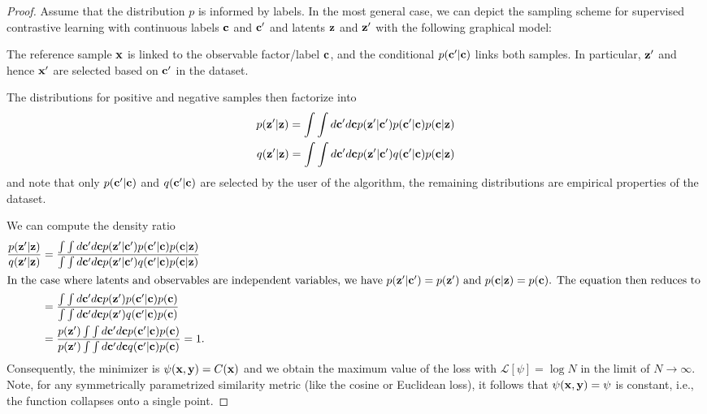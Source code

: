    \begin{proof}
    Assume that the distribution $p$ is informed by labels.
    In the most general case, we can depict the sampling scheme for supervised contrastive learning with continuous labels $\mathbf{c}$ and $\mathbf{c}'$ and latents $\mathbf{z}$ and $\mathbf{z}'$ with the following graphical model:
    
    \begin{center}
    \end{center}

    The reference sample $\mathbf{x}$ is linked to the observable factor/label $\mathbf{c}$, and the conditional $p(\mathbf{c}' | \mathbf{c})$ links both samples. In particular, $\mathbf{z}'$ and hence $\mathbf{x}'$ are selected based on $\mathbf{c}'$ in the dataset.

    The distributions for positive and negative samples then factorize into
    \begin{align}
        p(\mathbf{z}' | \mathbf{z}) = \int\int d\mathbf{c}' d\mathbf{c} p(\mathbf{z}' | \mathbf{c}') p(\mathbf{c}' | \mathbf{c}) p(\mathbf{c} | \mathbf{z})\\
        q(\mathbf{z}' | \mathbf{z}) = \int\int d\mathbf{c}' d\mathbf{c} p(\mathbf{z}' | \mathbf{c}') q(\mathbf{c}' | \mathbf{c}) p(\mathbf{c} | \mathbf{z})
    \end{align}
    and note that only $p(\mathbf{c}' | \mathbf{c})$ and $q(\mathbf{c}' | \mathbf{c})$ are selected by the user of the algorithm, the remaining distributions are empirical properties of the dataset.

    We can compute the density ratio
    \begin{align}
    \frac{p(\zz' | \zz)}{q(\zz' | \zz)} &= \frac{\int\int d\cc' d\cc p(\zz' | \cc') p(\cc' | \cc) p(\cc | \zz)}%
                          {\int\int d\cc' d\cc p(\zz' | \cc') q(\cc' | \cc) p(\cc | \zz)}\\
        \intertext{%
            In the case where latents and observables are independent variables, we have $p(\zz' | \cc') = p(\zz')$ and $p(\cc | \zz) = p(\cc)$. The equation then reduces to
        }
        &= \frac{\int\int d\cc' d\cc p(\zz') p(\cc' | \cc) p(\cc)}%
               {\int\int d\cc' d\cc p(\zz') q(\cc' | \cc) p(\cc)} \\
        &= \frac{p(\zz') \int\int d\cc' d\cc p(\cc' | \cc) p(\cc)}%
               {p(\zz') \int\int d\cc' d\cc q(\cc' | \cc) p(\cc)} = 1.
    \end{align}
    Consequently, the minimizer is $\psi(\mathbf{x}, \mathbf{y}) = C(\mathbf{x})$ and we obtain the maximum value of the loss with $\mathcal{L}[\psi] = \log N$ in the limit of $N \rightarrow \infty$.
    Note, for any symmetrically parametrized similarity metric (like the cosine or Euclidean loss), it follows that $\psi(\mathbf{x}, \mathbf{y}) = \psi$ is constant, i.e., the function collapses onto a single point.

\end{proof}

